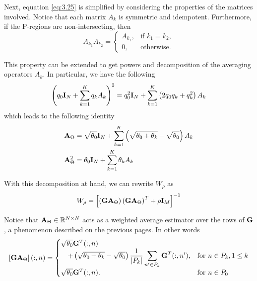 
Next, equation \eqref{eq:3.25} is simplified by considering the properties of the matrices involved.
%
Notice that each matrix $A_k$ is symmetric and idempotent.
%
Furthermore, if the P-regions are non-intersecting, then
\begin{equation}
    A_{k_1} A_{k_2} = 
    \begin{cases}
        A_{k_1}, &\text{if } k_1=k_2, \\
        0, &\text{otherwise.}
    \end{cases}
    \label{eq:3.27}
\end{equation}

This property can be extended to get powers and decomposition of the averaging operators $A_k$.
%
In particular, we have the following
\begin{equation}
    \left( q_0 \mathbf{I}_N + \sum_{k=1}^K q_k A_k \right)^2
    =
    q_0^2 \mathbf{I}_N + \sum_{k=1}^K \left( 2q_0 q_k + q_k^2 \right) A_k
\end{equation}
which leads to the following identity
\begin{align}
    \mathbf{A}_{\Theta} &=
    \sqrt{\theta_0} \mathbf{I}_N + \sum_{k=1}^K \left( \sqrt{\theta_0+\theta_k}-\sqrt{\theta_0} \right) A_k
    \\
    \mathbf{A}_{\Theta}^2
    &=
    {\theta_0} \mathbf{I}_N + \sum_{k=1}^K {\theta_k} A_k
\end{align}

With this decomposition at hand, we can rewrite $W_\rho$ as
\begin{equation}
    W_\rho =
    \left[  \left( \mathbf{G} \mathbf{A}_{{\Theta}} \right) \left( \mathbf{G} \mathbf{A}_{{\Theta}} \right)^T
    + \rho \mathbf{I}_M  \right]^{-1}
\end{equation}

Notice that $\mathbf{A}_\Theta\in \mathbb{R}^{N\times N}$ acts as a weighted average estimator over the rows of $\mathbf{G}$, a phenomenon described on the previous pages. In other words
\begin{equation}
    \left[ \mathbf{G} \mathbf{A}_\Theta \right](:, n) =
    \begin{cases}
    \sqrt{\theta_0} \mathbf{G}^T(:,n) 
    \\
    \quad + \left( \sqrt{\theta_0+\theta_k}-\sqrt{\theta_0} \right) \displaystyle\frac{1}{\left| {P_k} \right|} \sum_{n' \in P_k} \mathbf{G}^T(:, n'), &\text{for } n\in P_k, 1\leq k \\
    \sqrt{\theta_0} \mathbf{G}^T(:,n).
    &\text{for } n\in P_0
    \end{cases}
\end{equation}

